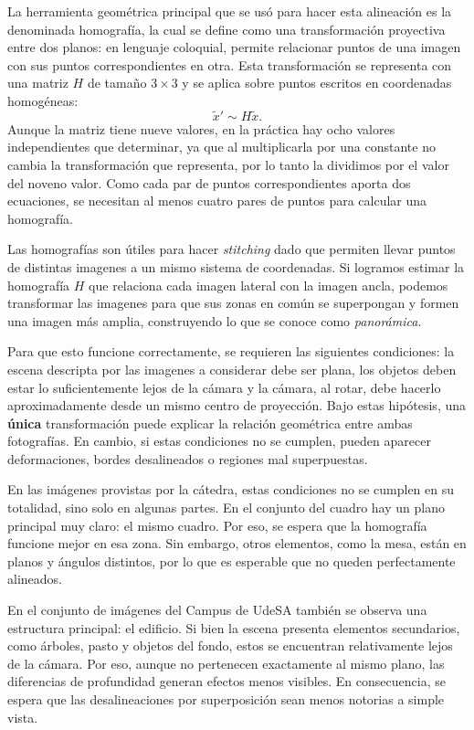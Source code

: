 \documentclass[a4paper,11pt]{article}
\begin{document}
La herramienta geométrica principal que se usó para hacer esta alineación es la denominada homografía, la cual se define como una transformación proyectiva entre dos planos: en lenguaje coloquial, permite relacionar puntos de una imagen con sus puntos correspondientes en otra. Esta transformación se representa con una matriz $H$ de tamaño $3 \times 3$ y se aplica sobre puntos escritos en coordenadas homogéneas:
\[
\tilde{x}' \sim H \tilde{x}.
\]
Aunque la matriz tiene nueve valores, en la práctica hay ocho valores independientes que determinar, ya que al multiplicarla por una constante no cambia la transformación que representa, por lo tanto la dividimos por el valor del noveno valor. Como cada par de puntos correspondientes aporta dos ecuaciones, se necesitan al menos cuatro pares de puntos para calcular una homografía.

Las homografías son útiles para hacer \textit{stitching} dado que permiten llevar puntos de distintas imagenes a un mismo sistema de coordenadas. Si logramos estimar la homografía $H$ que relaciona cada imagen lateral con la imagen ancla, podemos transformar las imagenes para que sus zonas en común se superpongan y formen una imagen más amplia, construyendo lo que se conoce como \textit{panorámica}.

Para que esto funcione correctamente, se requieren las siguientes condiciones: la escena descripta por las imagenes a considerar debe ser plana, los objetos deben estar lo suficientemente lejos de la cámara y la cámara, al rotar, debe hacerlo aproximadamente desde un mismo centro de proyección. Bajo estas hipótesis, una \textbf{única} transformación puede explicar la relación geométrica entre ambas fotografías. En cambio, si estas condiciones no se cumplen, pueden aparecer deformaciones, bordes desalineados o regiones mal superpuestas.

En las imágenes provistas por la cátedra, estas condiciones no se cumplen en su totalidad, sino solo en algunas partes. En el conjunto del cuadro hay un plano principal muy claro: el mismo cuadro. Por eso, se espera que la homografía funcione mejor en esa zona. Sin embargo, otros elementos, como la mesa, están en planos y ángulos distintos, por lo que es esperable que no queden perfectamente alineados.

En el conjunto de imágenes del Campus de UdeSA también se observa una estructura principal: el edificio. Si bien la escena presenta elementos secundarios, como árboles, pasto y objetos del fondo, estos se encuentran relativamente lejos de la cámara. Por eso, aunque no pertenecen exactamente al mismo plano, las diferencias de profundidad generan efectos menos visibles. En consecuencia, se espera que las desalineaciones por superposición sean menos notorias a simple vista.
\end{document}
